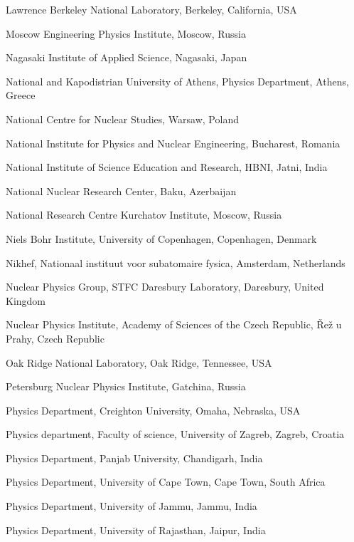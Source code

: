 \begin{flushleft}
\begin{Authlist}
\item {}Lawrence Berkeley National Laboratory, Berkeley, California, USA
\item {}Moscow Engineering Physics Institute, Moscow, Russia
\item {}Nagasaki Institute of Applied Science, Nagasaki, Japan
\item {}National and Kapodistrian University of Athens, Physics Department, Athens, Greece
\item {}National Centre for Nuclear Studies, Warsaw, Poland
\item {}National Institute for Physics and Nuclear Engineering, Bucharest, Romania
\item {}National Institute of Science Education and Research, HBNI, Jatni, India
\item {}National Nuclear Research Center, Baku, Azerbaijan
\item {}National Research Centre Kurchatov Institute, Moscow, Russia
\item {}Niels Bohr Institute, University of Copenhagen, Copenhagen, Denmark
\item {}Nikhef, Nationaal instituut voor subatomaire fysica, Amsterdam, Netherlands
\item {}Nuclear Physics Group, STFC Daresbury Laboratory, Daresbury, United Kingdom
\item {}Nuclear Physics Institute, Academy of Sciences of the Czech Republic, \v{R}e\v{z} u Prahy, Czech Republic
\item {}Oak Ridge National Laboratory, Oak Ridge, Tennessee, USA
\item {}Petersburg Nuclear Physics Institute, Gatchina, Russia
\item {}Physics Department, Creighton University, Omaha, Nebraska, USA
\item {}Physics department, Faculty of science, University of Zagreb, Zagreb, Croatia
\item {}Physics Department, Panjab University, Chandigarh, India
\item {}Physics Department, University of Cape Town, Cape Town, South Africa
\item {}Physics Department, University of Jammu, Jammu, India
\item {}Physics Department, University of Rajasthan, Jaipur, India

\end{Authlist}
\end{flushleft}
